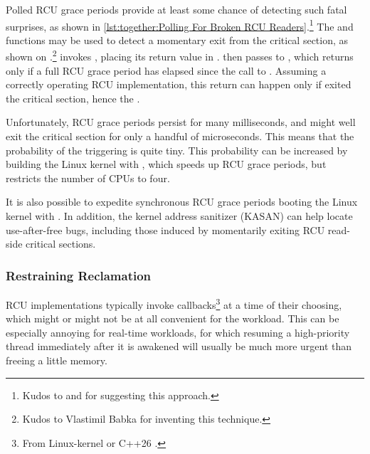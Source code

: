 \begin{fcvref}
Polled RCU grace periods provide at least some chance of detecting such
fatal surprises, as shown in
\cref{lst:together:Polling For Broken RCU Readers}.\footnote{
	Kudos to  and  for
	suggesting this approach.}
The  and 
functions may be used to detect a momentary exit from the critical section,
as shown on .\footnote{
	Kudos to Vlastimil Babka for inventing this technique.}
 invokes , placing its
return value in .
 then passes  to
, which returns 
only if a full RCU grace period has elapsed since the call to
.
Assuming a correctly operating RCU implementation, this  return
can happen only if  exited the critical section,
hence the .
\end{fcvref}

Unfortunately, RCU grace periods persist for many milliseconds, and
 might well exit the critical section for only
a handful of microseconds.
This means that the probability of the  triggering is
quite tiny.
This probability can be increased by building the Linux kernel with
, which speeds up RCU grace periods,
but restricts the number of CPUs to four.

It is also possible to expedite synchronous RCU grace periods booting the
Linux kernel with .
In addition, the kernel address sanitizer (KASAN) can help locate
use-after-free bugs, including those induced by momentarily exiting
RCU read-side critical sections.

\subsubsection{Restraining Reclamation}
\label{sec:together:Restraining Reclamation}

RCU implementations typically invoke callbacks\footnote{
	From Linux-kernel  or C++26 .}
at a time of their choosing, which might or might not be at all convenient
for the workload.
This can be especially annoying for real-time workloads, for which
resuming a high-priority thread immediately after it is awakened will
usually be much more urgent than freeing a little memory.

